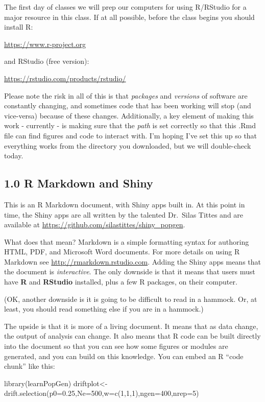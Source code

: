 \documentclass[
]{article}
\newenvironment{Shaded}{\begin{snugshade}}{\end{snugshade}}
\newcommand{\AttributeTok}[1]{\textcolor[rgb]{0.77,0.63,0.00}{#1}}
\newcommand{\DecValTok}[1]{\textcolor[rgb]{0.00,0.00,0.81}{#1}}
\newcommand{\FloatTok}[1]{\textcolor[rgb]{0.00,0.00,0.81}{#1}}
\newcommand{\FunctionTok}[1]{\textcolor[rgb]{0.00,0.00,0.00}{#1}}
\newcommand{\NormalTok}[1]{#1}
\newcommand{\OtherTok}[1]{\textcolor[rgb]{0.56,0.35,0.01}{#1}}
\begin{document}
The first day of classes we will prep our computers for using R/RStudio
for a major resource in this class. If at all possible, before the class
begins you should install R:

\url{https://www.r-project.org}

and RStudio (free version):

\url{https://rstudio.com/products/rstudio/}

Please note the risk in all of this is that \emph{packages} and
\emph{versions} of software are constantly changing, and sometimes code
that has been working will stop (and vice-versa) because of these
changes. Additionally, a key element of making this work - currently -
is making sure that the \emph{path} is set correctly so that this .Rmd
file can find figures and code to interact with. I'm hoping I've set
this up so that everything works from the directory you downloaded, but
we will double-check today.

\hypertarget{r-markdown-and-shiny}{%
\subsection{1.0 R Markdown and Shiny}\label{r-markdown-and-shiny}}

This is an R Markdown document, with Shiny apps built in. At this point
in time, the Shiny apps are all written by the talented Dr.~Silas Tittes
and are available at \url{https://github.com/silastittes/shiny_popgen}.

What does that mean? Markdown is a simple formatting syntax for
authoring HTML, PDF, and Microsoft Word documents. For more details on
using R Markdown see \url{http://rmarkdown.rstudio.com}. Adding the
Shiny apps means that the document is \emph{interactive}. The only
downside is that it means that users must have \textbf{R} and
\textbf{RStudio} installed, plus a few R packages, on their computer.

(OK, another downside is it is going to be difficult to read in a
hammock. Or, at least, you should read something else if you are in a
hammock.)

The upside is that it is more of a living document. It means that as
data change, the output of analysis can change. It also means that R
code can be built directly into the document so that you can see how
some figures or modules are generated, and you can build on this
knowledge. You can embed an R ``code chunk'' like this:

\begin{Shaded}
\begin{Highlighting}[]
\FunctionTok{library}\NormalTok{(learnPopGen)}
\NormalTok{driftplot}\OtherTok{\textless{}{-}}\FunctionTok{drift.selection}\NormalTok{(}\AttributeTok{p0=}\FloatTok{0.25}\NormalTok{,}\AttributeTok{Ne=}\DecValTok{500}\NormalTok{,}\AttributeTok{w=}\FunctionTok{c}\NormalTok{(}\DecValTok{1}\NormalTok{,}\DecValTok{1}\NormalTok{,}\DecValTok{1}\NormalTok{),}\AttributeTok{ngen=}\DecValTok{400}\NormalTok{,}\AttributeTok{nrep=}\DecValTok{5}\NormalTok{)}
\end{Highlighting}
\end{Shaded}
\end{document}
